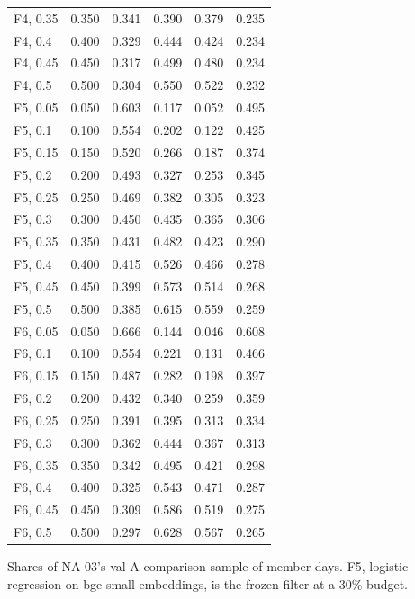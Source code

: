 \begin{longtable}{@{}lS[table-format=1.3]S[table-format=1.3]S[table-format=1.3]S[table-format=1.3]S[table-format=1.3]@{}}
F4, 0.35 & 0.350 & 0.341 & 0.390 & 0.379 & 0.235 \\
F4, 0.4 & 0.400 & 0.329 & 0.444 & 0.424 & 0.234 \\
F4, 0.45 & 0.450 & 0.317 & 0.499 & 0.480 & 0.234 \\
F4, 0.5 & 0.500 & 0.304 & 0.550 & 0.522 & 0.232 \\
F5, 0.05 & 0.050 & 0.603 & 0.117 & 0.052 & 0.495 \\
F5, 0.1 & 0.100 & 0.554 & 0.202 & 0.122 & 0.425 \\
F5, 0.15 & 0.150 & 0.520 & 0.266 & 0.187 & 0.374 \\
F5, 0.2 & 0.200 & 0.493 & 0.327 & 0.253 & 0.345 \\
F5, 0.25 & 0.250 & 0.469 & 0.382 & 0.305 & 0.323 \\
F5, 0.3 & 0.300 & 0.450 & 0.435 & 0.365 & 0.306 \\
F5, 0.35 & 0.350 & 0.431 & 0.482 & 0.423 & 0.290 \\
F5, 0.4 & 0.400 & 0.415 & 0.526 & 0.466 & 0.278 \\
F5, 0.45 & 0.450 & 0.399 & 0.573 & 0.514 & 0.268 \\
F5, 0.5 & 0.500 & 0.385 & 0.615 & 0.559 & 0.259 \\
F6, 0.05 & 0.050 & 0.666 & 0.144 & 0.046 & 0.608 \\
F6, 0.1 & 0.100 & 0.554 & 0.221 & 0.131 & 0.466 \\
F6, 0.15 & 0.150 & 0.487 & 0.282 & 0.198 & 0.397 \\
F6, 0.2 & 0.200 & 0.432 & 0.340 & 0.259 & 0.359 \\
F6, 0.25 & 0.250 & 0.391 & 0.395 & 0.313 & 0.334 \\
F6, 0.3 & 0.300 & 0.362 & 0.444 & 0.367 & 0.313 \\
F6, 0.35 & 0.350 & 0.342 & 0.495 & 0.421 & 0.298 \\
F6, 0.4 & 0.400 & 0.325 & 0.543 & 0.471 & 0.287 \\
F6, 0.45 & 0.450 & 0.309 & 0.586 & 0.519 & 0.275 \\
F6, 0.5 & 0.500 & 0.297 & 0.628 & 0.567 & 0.265 \\
\end{longtable}
\endgroup
\vspace{-0.5\baselineskip}
{\footnotesize\raggedright
Shares of NA-03's val-A comparison sample of member-days. F5, logistic regression on bge-small embeddings, is the frozen filter at a 30\% budget.\par
}
